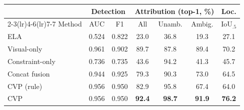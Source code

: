 \begin{tabular}{lcccccc}
\toprule
 & \multicolumn{2}{c}{Detection} & \multicolumn{3}{c}{Attribution (top-1, \%)} & Loc.\\
\cmidrule(lr){2-3}\cmidrule(lr){4-6}\cmidrule(lr){7-7}
Method & AUC & F1 & All & Unamb. & Ambig. & IoU$_{.5}$\\
\midrule
ELA & 0.524 & 0.822 & 23.0 & 36.8 & 19.3 & 27.1\\
Visual-only & 0.961 & 0.902 & 89.7 & 87.8 & 89.4 & 70.2\\
Constraint-only & 0.736 & 0.735 & 43.6 & 94.2 & 41.3 & 45.7\\
Concat fusion & 0.944 & 0.925 & 79.3 & 90.3 & 73.0 & 64.5\\
CVP (rule) & 0.956 & 0.950 & 82.9 & 95.8 & 67.4 & 64.0\\
CVP & 0.956 & 0.950 & \textbf{92.4} & \textbf{98.7} & \textbf{91.9} & \textbf{76.2}\\
\bottomrule
\end{tabular}
